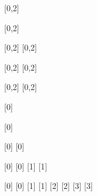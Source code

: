 \documentclass{standalone}
\begin{document}
  \begin{cartonaugh}[2][4][1]
  \end{cartonaugh}
  \begin{cartonaugh}[4][2][1]
  \end{cartonaugh}
  \begin{cartonaugh}[4][4][1]
  \end{cartonaugh}
  \begin{cartonaugh}[4][4][2]
  \end{cartonaugh}
  \begin{cartonaugh}[4][4][4]
  \end{cartonaugh}
  \begin{cartonaugh}[2][4][1]
    [0,2]
  \end{cartonaugh}
  \begin{cartonaugh}[4][2][1]
    [0,2]
  \end{cartonaugh}
  \begin{cartonaugh}[4][4][1]
    [0,2]
    [0,2]
  \end{cartonaugh}
  \begin{cartonaugh}[4][4][2]
    [0,2]
    [0,2]
  \end{cartonaugh}
  \begin{cartonaugh}[4][4][4]
    [0,2]
    [0,2]
  \end{cartonaugh}
  \begin{cartonaugh}[2][4][1]
    [0]
  \end{cartonaugh}
  \begin{cartonaugh}[4][2][1]
    [0]
  \end{cartonaugh}
  \begin{cartonaugh}[4][4][1]
    [0]
    [0]
  \end{cartonaugh}
  \begin{cartonaugh}[4][4][2]
    [0]
    [0]
    [1]
    [1]
  \end{cartonaugh}
  \begin{cartonaugh}[4][4][4]
    [0]
    [0]
    [1]
    [1]
    [2]
    [2]
    [3]
    [3]
  \end{cartonaugh}
\end{document}
